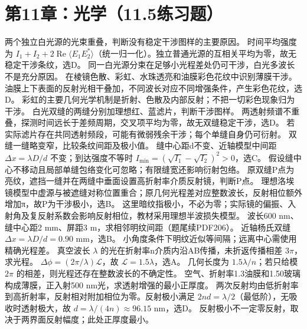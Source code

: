 \section{第11章：光学（11.5练习题）}
\problemtext 两个独立白光源的光束重叠，判断没有稳定干涉图样的主要原因。
\workings 时间平均强度为 $I_1+I_2+2\operatorname{Re}\langle E_1 E_2^*\rangle$（统一归一化）。独立普通光源的互相关平均为零，故无稳定干涉条纹，选D。
\crosscheck 同一白光源分束在足够小光程差处仍可干涉，白光多波长不是充分原因。
\problemtext 在棱镜色散、彩虹、水珠透亮和油膜彩色花纹中识别薄膜干涉。
\workings 油膜上下表面的反射光相干叠加，不同波长对应不同增强条件，产生彩色花纹，选D。
\crosscheck 彩虹的主要几何光学机制是折射、色散及内部反射；不把一切彩色现象归为干涉。
\problemtext 白光双缝的两缝分别加理想红、蓝滤片，判断干涉图样。
\workings 两透射频谱不重叠，探测时间远长于差频周期，交叉项平均为零，故无双缝稳定干涉，选D。
\crosscheck 若实际滤片存在共同透射频段，可能有微弱残余干涉；每个单缝自身仍可衍射。
\problemtext 双缝一缝略变窄，比较条纹间距及极小值。
\workings 缝中心距d不变、近轴模型中间距 $\Delta x=\lambda D/d$ 不变；到达强度不等时 $I_{\min}=(\sqrt{I_1}-\sqrt{I_2})^2>0$，选C。
\crosscheck 假设缝中心不移动且局部单缝包络变化可忽略；有限缝宽还影响衍射包络。
\problemtext 原双缝P点为亮纹，遮挡一缝并在两缝中垂面设置高折射率介质反射镜，判断P点。
\workings 理想洛埃镜模型中虚源与被遮缝对称位置重合；原几何光程差对应整数波长，反射相位额外增加π，故P为干涉极小，选B。
\crosscheck 这里暗纹指极小，不必为零；实际镜的偏振、入射角及复反射系数会影响反射相位，教材采用理想半波损失模型。
\problemtext 波长600 nm、缝中心距2 mm、屏距3 m，求相邻明纹间距（题尾续PDF206）。
\workings 近轴杨氏双缝 $\Delta x=\lambda D/d=0.90$ mm，选B。
\crosscheck 小角度条件下明纹近似等间隔；远离中心需使用精确光程差。
\problemtext 真空波长 $\lambda$ 的光在折射率n介质内沿AB传播，未折返传播相差 $3\pi$，求光程。
\workings $\Delta\phi=(2\pi/\lambda)\mathcal L$，故 $\mathcal L=1.5\lambda$，选A。
\crosscheck 几何长度为 $1.5\lambda/n$；若只给模 $2\pi$ 的相差，则光程还存在整数波长的不确定性。
\problemtext 空气、折射率1.3油膜和1.50玻璃构成薄膜，正入射500 nm光，求透射增强的最小正厚度。
\workings 两次反射均由低折射率到高折射率，反射相对附加相位为零。反射极小满足 $2nd=\lambda/2$（最低阶），无吸收时透射极大，故 $d=\lambda/(4n)\approx96.15$ nm，选D。
\crosscheck 反射极小不一定零反射，取决于两界面反射幅度；此处正厚度最小。
